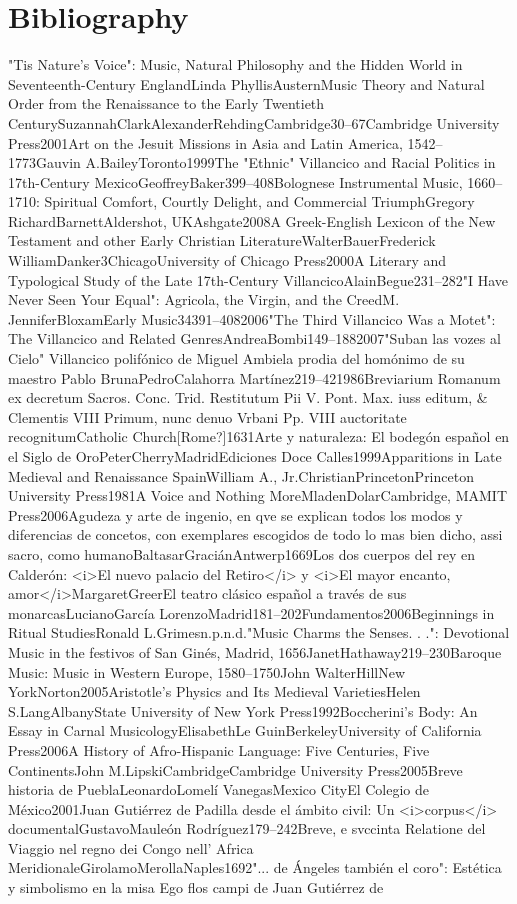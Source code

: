 \documentclass{memoir}
\begin{document}
{{{{{{{{    \chapter{Bibliography}
    \label{biblio}
    "Tis Nature's Voice": Music, Natural Philosophy and the Hidden World in Seventeenth-Century EnglandLinda PhyllisAusternMusic Theory and Natural Order from the Renaissance to the Early Twentieth CenturySuzannahClarkAlexanderRehdingCambridge30–67Cambridge University Press2001Art on the Jesuit Missions in Asia and Latin America, 1542–1773Gauvin A.BaileyToronto1999The "Ethnic" Villancico and Racial Politics in 17th-Century MexicoGeoffreyBaker399–408Bolognese Instrumental Music, 1660–1710: Spiritual Comfort, Courtly Delight, and Commercial TriumphGregory RichardBarnettAldershot, UKAshgate2008A Greek-English Lexicon of the New Testament and other Early Christian LiteratureWalterBauerFrederick WilliamDanker3ChicagoUniversity of Chicago Press2000A Literary and Typological Study of the Late 17th-Century VillancicoAlainBegue231–282"I Have Never Seen Your Equal": Agricola, the Virgin, and the CreedM. JenniferBloxamEarly Music34391–4082006"The Third Villancico Was a Motet": The Villancico and Related GenresAndreaBombi149–1882007"Suban las vozes al Cielo" Villancico polifónico de Miguel Ambiela prodia del homónimo de su maestro Pablo BrunaPedroCalahorra Martínez219–421986Breviarium Romanum ex decretum Sacros. Conc. Trid. Restitutum Pii V. Pont. Max. iuss editum, & Clementis VIII Primum, nunc denuo Vrbani Pp. VIII auctoritate recognitumCatholic Church[Rome?]1631Arte y naturaleza: El bodegón español en el Siglo de OroPeterCherryMadridEdiciones Doce Calles1999Apparitions in Late Medieval and Renaissance SpainWilliam A., Jr.ChristianPrincetonPrinceton University Press1981A Voice and Nothing MoreMladenDolarCambridge, MAMIT Press2006Agudeza y arte de ingenio, en qve se explican todos los modos y diferencias de concetos, con exemplares escogidos de todo lo mas bien dicho, assi sacro, como humanoBaltasarGraciánAntwerp1669Los dos cuerpos del rey en Calderón: <i>El nuevo palacio del Retiro</i> y <i>El mayor encanto, amor</i>MargaretGreerEl teatro clásico español a través de sus monarcasLucianoGarcía LorenzoMadrid181–202Fundamentos2006Beginnings in Ritual StudiesRonald L.Grimesn.p.n.d."Music Charms the Senses. . .": Devotional Music in the \mkbibemphTriunfos festivos of San Ginés, Madrid, 1656JanetHathaway219–230Baroque Music: Music in Western Europe, 1580–1750John WalterHillNew YorkNorton2005Aristotle's Physics and Its Medieval VarietiesHelen S.LangAlbanyState University of New York Press1992Boccherini's Body: An Essay in Carnal MusicologyElisabethLe GuinBerkeleyUniversity of California Press2006A History of Afro-Hispanic Language: Five Centuries, Five ContinentsJohn M.LipskiCambridgeCambridge University Press2005Breve historia de PueblaLeonardoLomelí VanegasMexico CityEl Colegio de México2001Juan Gutiérrez de Padilla desde el ámbito civil: Un <i>corpus</i> documentalGustavoMauleón Rodríguez179–242Breve, e svccinta Relatione del Viaggio nel regno dei Congo nell' Africa MeridionaleGirolamoMerollaNaples1692"... de Ángeles también el coro": Estética y simbolismo en la misa Ego flos campi de Juan Gutiérrez de }}}}}}}}
\end{document}
